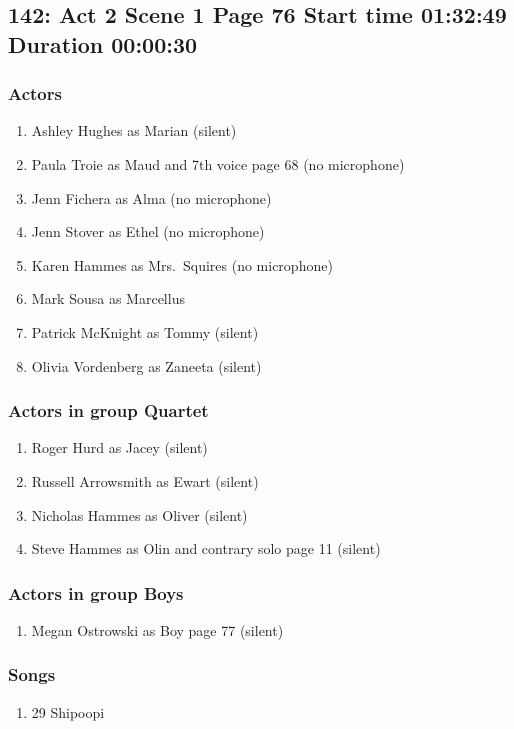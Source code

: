 \subsection{142: Act 2 Scene 1 Page 76 Start time 01:32:49 Duration 00:00:30}

\subsubsection{Actors}
\begin{enumerate}
\item Ashley Hughes as Marian (silent)
\item Paula Troie as Maud and 7th voice page 68 (no microphone)
\item Jenn Fichera as Alma (no microphone)
\item Jenn Stover as Ethel (no microphone)
\item Karen Hammes as Mrs.~Squires (no microphone)
\item Mark Sousa as Marcellus
\item Patrick McKnight as Tommy (silent)
\item Olivia Vordenberg as Zaneeta (silent)
\end{enumerate}
\subsubsection{Actors in group Quartet}
\begin{enumerate}
\item Roger Hurd as Jacey (silent)
\item Russell Arrowsmith as Ewart (silent)
\item Nicholas Hammes as Oliver (silent)
\item Steve Hammes as Olin and contrary solo page 11 (silent)
\end{enumerate}
\subsubsection{Actors in group Boys}
\begin{enumerate}
\item Megan Ostrowski as Boy page 77 (silent)
\end{enumerate}

\subsubsection{Songs}
\begin{enumerate}
\item 29 Shipoopi
\end{enumerate}
